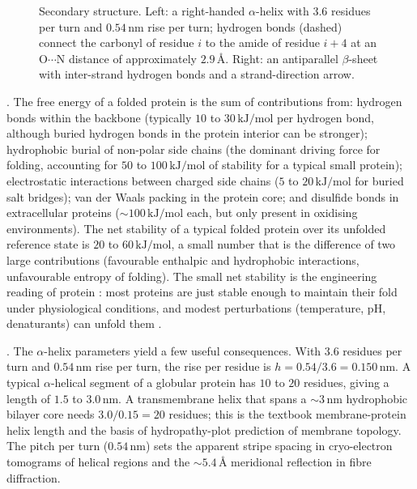 \begin{figure}[ht]
\centering

\caption{Secondary structure. Left: a right-handed $\alpha$-helix with
$3.6$ residues per turn and $0.54\,\text{nm}$ rise per turn; hydrogen
bonds (dashed) connect the carbonyl of residue $i$ to the amide of
residue $i+4$ at an $\text{O} \cdots \text{N}$ distance of
approximately $2.9\,\si{\angstrom}$. Right: an antiparallel
$\beta$-sheet with inter-strand hydrogen bonds and a strand-direction
arrow.}
\label{fig:v6c04-secondary}
\end{figure}

. The free energy of a folded protein is the sum
of contributions from: hydrogen bonds within the backbone (typically
$10$ to $30\,\text{kJ}/\text{mol}$ per hydrogen bond, although
buried hydrogen bonds in the protein interior can be stronger);
hydrophobic burial of non-polar side chains (the dominant driving
force for folding, accounting for $50$ to $100\,\text{kJ}/\text{mol}$
of stability for a typical small protein); electrostatic interactions
between charged side chains ($5$ to $20\,\text{kJ}/\text{mol}$ for
buried salt bridges); van der Waals packing in the protein core; and
disulfide bonds in extracellular proteins ($\sim 100\,\text{kJ}/\text{mol}$
each, but only present in oxidising environments). The net stability
of a typical folded protein over its unfolded reference state is
$20$ to $60\,\text{kJ}/\text{mol}$, a small number that is the
difference of two large contributions (favourable enthalpic and
hydrophobic interactions, unfavourable entropy of folding). The
small net stability is the engineering reading of protein
: most proteins are just stable enough
to maintain their fold under physiological conditions, and modest
perturbations (temperature, pH, denaturants) can unfold them
\cite[ch.~4]{text:branden-tooze-proteins,text:v6c04-creighton-proteins-1993}.

. The $\alpha$-helix
parameters yield a few useful consequences. With $3.6$ residues per
turn and $0.54\,\text{nm}$ rise per turn, the rise per residue is
$h = 0.54/3.6 = 0.150\,\text{nm}$. A typical $\alpha$-helical segment
of a globular protein has $10$ to $20$ residues, giving a length of
$1.5$ to $3.0\,\text{nm}$. A transmembrane helix that spans a
$\sim 3\,\text{nm}$ hydrophobic bilayer core needs $3.0/0.15 = 20$
residues; this is the textbook membrane-protein helix length and the
basis of hydropathy-plot prediction of membrane topology. The pitch
per turn ($0.54\,\text{nm}$) sets the apparent stripe spacing in
cryo-electron tomograms of helical regions and the
$\sim 5.4\,\si{\angstrom}$ meridional reflection in fibre diffraction.

